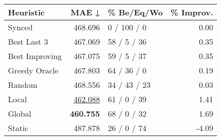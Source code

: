 \begin{tabular}{lrlr}
\toprule
\textbf{Heuristic} & \textbf{MAE ↓} & \textbf{\% Be/Eq/Wo} & \textbf{\% Improv.} \\
\midrule
            Synced &        468.696 &          0 / 100 / 0 &                0.00 \\
\midrule
       Best Last 3 &        467.069 &          58 / 5 / 36 &                0.35 \\
    Best Improving &        467.075 &          59 / 5 / 37 &                0.35 \\
\addlinespace
     Greedy Oracle &        467.803 &          64 / 36 / 0 &                0.19 \\
            Random &        468.556 &         34 / 43 / 23 &                0.03 \\
\midrule
             Local &        \underline{462.088} &          61 / 0 / 39 &                1.41 \\
            Global &        \textbf{460.755} &          68 / 0 / 32 &                1.69 \\
\midrule
            Static &        487.878 &          26 / 0 / 74 &               -4.09 \\
\bottomrule
\end{tabular}

\label{tab:non_lr01_le1_bs4_Summary}
